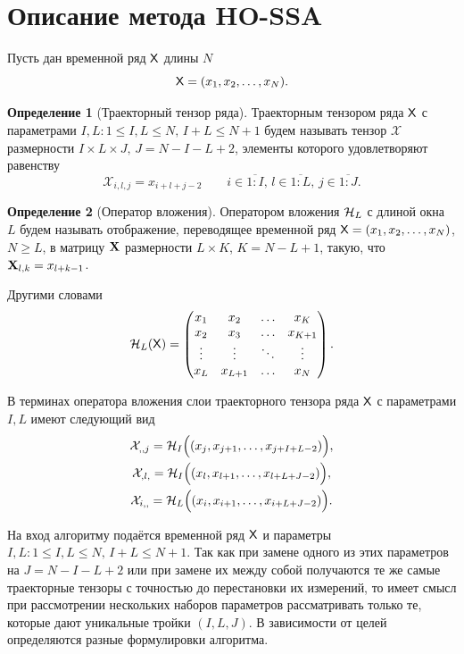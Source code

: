 \documentclass[specialist,
    substylefile = spbu_report.rtx,
    subf,href,colorlinks=true, 12pt]{disser}
\theoremstyle{plain}
\theoremstyle{definition}
\newtheorem{definition}{Определение}[section]
\theoremstyle{remark}
\begin{document}
    \section{Описание метода HO-SSA}\label{sec:HO-SSA-method-description}
    Пусть дан временной ряд $\mathsf{X}$ длины $N$
    \[
        \mathsf{X}=(x_1,x_2,\ldots,x_N).
    \]
    \begin{definition}[Траекторный тензор ряда]
        Траекторным тензором ряда $\mathsf{X}$ с параметрами $I,L: 1\leqslant I,L \leqslant N,\, I + L \leqslant N + 1$
        будем называть тензор $\mathcal{X}$ размерности $I\times L \times J,\, J=N-I-L+2$, элементы которого удовлетворяют равенству
        \[
            \mathcal{X}_{i,l,j}=x_{i+l+j-2}\qquad i\in \overline{1:I},\, l \in\overline{1:L},\, j \in\overline{1:J}.
        \]
    \end{definition}
    \begin{definition}[Оператор вложения]
        \label{def:injection-op}
        Оператором вложения $\mathcal{H}_L$ с длиной окна $L$ будем называть отображение, переводящее временной ряд
        $\mathsf{X}=(x_1, x_2,\ldots, x_N)$, $N \geqslant L$, в матрицу $\mathbf{X}$ размерности $L\times K$, $K = N-L+1$,
        такую, что $\mathbf{X}_{l,k}=x_{l+k-1}$.

        Другими словами
        \[
            \mathcal{H}_L(\mathsf{X}) =
            \begin{pmatrix}
                x_1    & x_2     & \ldots & x_K     \\
                x_2    & x_3     & \ldots & x_{K+1} \\
                \vdots & \vdots  & \ddots & \vdots  \\
                x_L    & x_{L+1} & \ldots & x_N
            \end{pmatrix}.
        \]
    \end{definition}

    В терминах оператора вложения слои траекторного тензора ряда $\mathsf{X}$
    с параметрами $I, L$ имеют следующий вид
    \begin{gather*}
        \mathcal{X}_{,,j}= \mathcal{H}_I \Big((x_j, x_{j+1}, \ldots, x_{j+I+L-2})\Big),\\
        \mathcal{X}_{,l,}= \mathcal{H}_I \Big((x_l, x_{l+1}, \ldots, x_{l+L+J-2})\Big),\\
        \mathcal{X}_{i,,}=\mathcal{H}_L \Big((x_i, x_{i+1}, \ldots, x_{i+L+J-2})\Big).\\
    \end{gather*}

    На вход алгоритму подаётся временной ряд $\mathsf{X}$ и параметры $I,L: 1\leqslant I,L \leqslant N,\, I + L \leqslant N + 1$.
    Так как при замене одного из этих параметров на $J=N-I-L+2$ или при замене их между собой получаются
    те же самые траекторные тензоры с точностью до перестановки их измерений, то имеет смысл при
    рассмотрении нескольких наборов параметров рассматривать только те, которые дают уникальные тройки $(I, L, J)$.
    В зависимости от целей определяются разные формулировки алгоритма.
\end{document}
